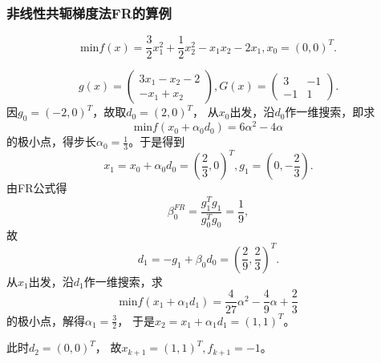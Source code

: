         \subsubsection{非线性共轭梯度法FR的算例}
        \begin{example}
            \begin{equation}
                \mathrm {min}f(x) = \frac{3}{2}x_1^2+\frac{1}{2}x_2^2-x_1x_2-2x_1,
                x_0 = (0,0)^T.
            \nonumber
            \end{equation}
        \end{example}
        \begin{solution}
            \begin{equation}
                g(x) = 
                \begin{pmatrix}
                    3x_1-x_2-2 \\
                    -x_1+x_2  
                \end{pmatrix},
                G(x) = 
                \begin{pmatrix}
                    3 & -1\\
                    -1 & 1   
                \end{pmatrix}.
            \nonumber    
            \end{equation}
            因$g_0=(-2,0)^T$，故取$d_0=(2,0)^T$，
            从$x_0$出发，沿$d_0$作一维搜索，即求
            \begin{equation*}
            \mathrm {min}f(x_0+\alpha_0 d_0) = 6\alpha^2-4\alpha
            \end{equation*}
            的极小点，得步长$\alpha_0 = \frac{1}{3}$。于是得到
            \begin{equation*}
                x_1=x_0 + \alpha_0d_0=(\frac{2}{3},0)^T,
                g_1 = (0,-\frac{2}{3}).
            \end{equation*}
            由FR公式得
            \begin{equation*}
                \beta_{0}^{FR}=\displaystyle\frac{g_1^Tg_1}{g_{0}^Tg_{0}} = \frac{1}{9},
            \end{equation*}
            故
            \begin{equation}
                d_1 = -g_1 + \beta_0d_0=(\frac{2}{9},\frac{2}{3})^T.
            \end{equation}
            从$x_1$出发，沿$d_1$作一维搜索，求
            \begin{equation}
                \mathrm {min}f(x_1+\alpha_1 d_1) = 
                \frac{4}{27}\alpha^2-\frac{4}{9}\alpha + \frac{2}{3}
                \nonumber
            \end{equation}
            的极小点，解得$\alpha_1= \frac{3}{2}$，
            于是$x_2 = x_1 + \alpha_1d_1 = (1,1)^T$。

            此时$d_2=(0,0)^T$，
            故$x_{k+1}=(1,1)^T, f_{k+1} = -1$。
        \end{solution}
        
